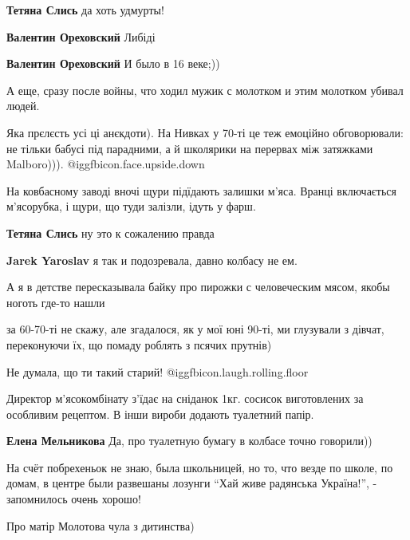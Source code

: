 \begin{itemize}
\begin{itemize}
\textbf{Тетяна Слись} да хоть удмурты!

\textbf{Валентин Ореховский} Либіді

\textbf{Валентин Ореховский} И было в 16 веке;))
\end{itemize} %

А еще, сразу после войны, что ходил мужик с молотком и этим молотком убивал людей.


Яка прєлєсть усі ці анєкдоти). На Нивках у 70-ті це теж емоційно обговорювали:
не тільки бабусі під парадними, а й школярики на перервах між затяжками
Malboro))).  @igg{fbicon.face.upside.down} 



На ковбасному заводі вночі щури підїдають залишки м'яса. Вранці включається
м'ясорубка, і щури, що туди залізли, ідуть у фарш.

\begin{itemize} %
\textbf{Тетяна Слись} ну это к сожалению правда

\textbf{Jarek Yaroslav} я так и подозревала, давно колбасу не ем.

А я в детстве пересказывала байку про пирожки с человеческим мясом, якобы ноготь где-то нашли
\end{itemize} %

за 60-70-ті не скажу, але згадалося, як у мої юні 90-ті, ми глузували з дівчат, переконуючи їх, що
помаду роблять з псячих прутнів)

Не думала, що ти такий старий! @igg{fbicon.laugh.rolling.floor} 

Директор м'ясокомбінату з'їдає на сніданок 1кг. сосисок виготовлених за особливим рецептом.
В інши вироби додають туалетний папір.

\textbf{Елена Мельникова} Да, про туалетную бумагу в колбасе точно говорили))


На счёт побрехеньок не знаю, была школьницей, но то, что везде по школе, по
домам, в центре были развешаны лозунги \enquote{Хай живе радянська Україна!}, -
запомнилось очень хорошо!


Про матір Молотова чула з дитинства)


\end{itemize}
